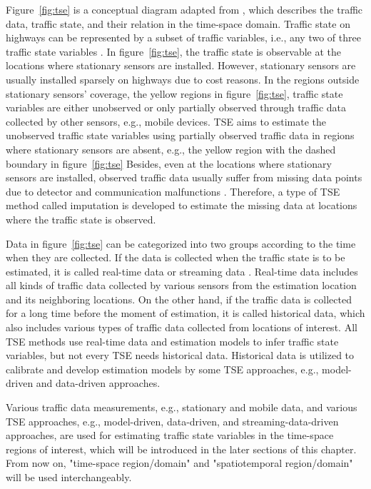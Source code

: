 \documentclass[english]{kththesis}
\begin{document}
Figure~\ref{fig:tse} is a conceptual diagram adapted from \cite{seo_tse}, which describes the traffic data, traffic state, and their relation in the time-space domain. Traffic state on highways can be represented by a subset of traffic variables, i.e., any two of three traffic state variables \cite{seo_tse}. In figure~\ref{fig:tse}, the traffic state is observable at the locations where stationary sensors are installed. However, stationary sensors are usually installed sparsely on highways due to cost reasons. In the regions outside stationary sensors' coverage, the yellow regions in figure~\ref{fig:tse}, traffic state variables are either unobserved or only partially observed through traffic data collected by other sensors, e.g., mobile devices. TSE aims to estimate the unobserved traffic state variables using partially observed traffic data in regions where stationary sensors are absent, e.g., the yellow region with the dashed boundary in figure~\ref{fig:tse} Besides, even at the locations where stationary sensors are installed, observed traffic data usually suffer from missing data points due to detector and communication malfunctions \cite{duan_dl_imputation, chen_imputation_regression}. Therefore, a type of TSE method called imputation is developed to estimate the missing data at locations where the traffic state is observed.

Data in figure~\ref{fig:tse} can be categorized into two groups according to the time when they are collected. If the data is collected when the traffic state is to be estimated, it is called real-time data or streaming data \cite{seo_tse}. Real-time data includes all kinds of traffic data collected by various sensors from the estimation location and its neighboring locations. On the other hand, if the traffic data is collected for a long time before the moment of estimation, it is called historical data, which also includes various types of traffic data collected from locations of interest. All TSE methods use real-time data and estimation models to infer traffic state variables, but not every TSE needs historical data. Historical data is utilized to calibrate and develop estimation models by some TSE approaches, e.g., model-driven and data-driven approaches.

Various traffic data measurements, e.g., stationary and mobile data, and various TSE approaches, e.g., model-driven, data-driven, and streaming-data-driven approaches, are used for estimating traffic state variables in the time-space regions of interest, which will be introduced in the later sections of this chapter. From now on, "time-space region/domain" and "spatiotemporal region/domain" will be used interchangeably.
\end{document}

